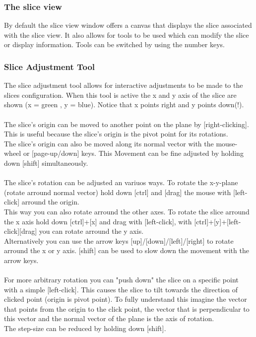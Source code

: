 \subsubsection{The slice view}

By default the slice view window offers a canvas that displays the slice associated with the slice view. It also allows for tools to be used which can modify the slice or display information. Tools can be switched by using the number keys.

\subsubsection{Slice Adjustment Tool}
The slice adjustment tool allows for interactive adjustments to be made to the slices configuration.
When this tool is active the x and y axis of the slice are shown (x = green , y = blue). Notice that x points
right and y points down(!).
\\ \\
The slice's origin can be moved to another point on the plane by [right-clicking]. This is useful because the slice's origin is the pivot point for its rotations.\\
The slice's origin can also be moved along its normal vector with the mouse-wheel or [page-up/down] keys. This
Movement can be fine adjusted by holding down [shift] simultaneously.
\\ \\
The slice's rotation can be adjusted an variuos ways.
To rotate the x-y-plane (rotate arround normal vector) hold down [ctrl] and [drag] the mouse with [left-click] arround the origin. \\
This way you can also rotate arround the other axes. To rotate the slice arround the x axis hold down [ctrl]+[x] and drag with [left-click], with [ctrl]+[y]+[left-click][drag] you can rotate arround the y axis. \\
Alternatively you can use the arrow keys [up]/[down]/[left]/[right] to rotate arround the x or y axis. [shift] can be used to slow down the movement with the arrow keys.
\\ \\
For more arbitrary rotation you can "push down" the slice on a specific point with a simple [left-click]. This causes the slice to tilt towards the direction of clicked point (origin is pivot point). To fully understand this imagine the vector that points from the origin to the click point, the vector that is perpendicular to this vector and the normal vector of the plane is the axis of rotation.\\
The step-size can be reduced by holding down [shift]. 

